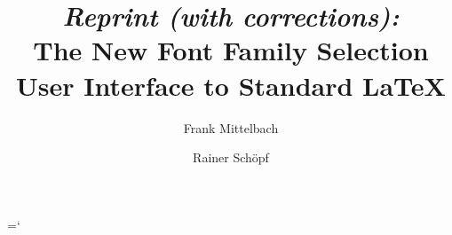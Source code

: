 
 
\makeatother
 
 
 
 \newmathalphabet\sfmath
 \newmathalphabet*{}
 
 
\def\resetmathcodes{%
\mathcode`\0="7030
\mathcode`\1="7031
\mathcode`\2="7032
\mathcode`\3="7033
\mathcode`\4="7034
\mathcode`\5="7035
\mathcode`\6="7036
\mathcode`\7="7037
\mathcode`\8="7038
\mathcode`\9="7039
\mathchardef\sum="1350
}
 
\def\bf{\family{cmss}\series{bx}\selectfont}
 
\def\meta#1{$\langle${\it
                      \hyphenchar\the\font-1
                      #1\/$\rangle$}}
 
 
\def\Metafont{{\sf METAFONT}}
 
\chardef\bslash=`\\
 
\def\missing{[\ldots]\ }
 
 
 
 
 \title{{\it Reprint {\rm(}with corrections\/{\rm):}}\\
        The New Font Family Selection\Dash \\
        User Interface to Standard \LaTeX}
 
 \author{Frank Mittelbach \and
         Rainer Sch\"opf}%
 
 
 
 

 
 
